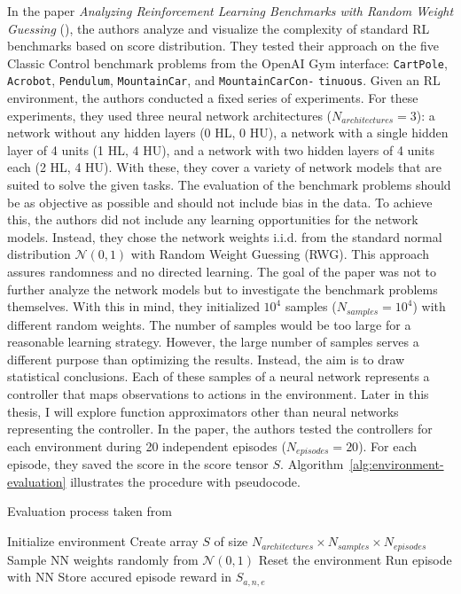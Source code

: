 In the paper \emph{Analyzing Reinforcement Learning Benchmarks with Random Weight Guessing} (\citet{oller_analyzing_2020}), the authors analyze and visualize the complexity of standard RL benchmarks based on score distribution. They tested their approach on the five Classic Control benchmark problems from the OpenAI Gym interface: \verb|CartPole|, \verb|Acrobot|, \verb|Pendulum|, \verb|MountainCar|, and \verb|MountainCarCon-| \verb|tinuous|. Given an RL environment, the authors conducted a fixed series of experiments. For these experiments, they used three neural network architectures ($N_{architectures}=3$): a network without any hidden layers (0 HL, 0 HU), a network with a single hidden layer of 4 units (1 HL, 4 HU), and a network with two hidden layers of 4 units each (2 HL, 4 HU). With these, they cover a variety of network models that are suited to solve the given tasks. The evaluation of the benchmark problems should be as objective as possible and should not include bias in the data. To achieve this, the authors did not include any learning opportunities for the network models. Instead, they chose the network weights i.i.d. from the standard normal distribution $\mathcal{N}(0,1)$ with Random Weight Guessing (RWG). This approach assures randomness and no directed learning. The goal of the paper was not to further analyze the network models but to investigate the benchmark problems themselves. With this in mind, they initialized $10^4$ samples ($N_{samples}=10^4$) with different random weights. The number of samples would be too large for a reasonable learning strategy. However, the large number of samples serves a different purpose than optimizing the results. Instead, the aim is to draw statistical conclusions. Each of these samples of a neural network represents a controller that maps observations to actions in the environment. Later in this thesis, I will explore function approximators other than neural networks representing the controller. In the paper, the authors tested the controllers for each environment during 20 independent episodes ($N_{episodes}=20$). For each episode, they saved the score in the score tensor $S$. Algorithm~\ref{alg:environment-evaluation} illustrates the procedure with pseudocode.

\begin{algorithm}
\caption{Evaluation process taken from \citet{oller_analyzing_2020}}
\begin{algorithmic}[1]
\State Initialize environment
\State Create array $S$ of size $N_{architectures} \times N_{samples} \times N_{episodes}$
    \State Sample NN weights randomly from $\mathcal{N}(0,1)$
      \State Reset the environment
      \State Run episode with NN
      \State Store accured episode reward in $S_{a,n,e}$
    \EndFor
\EndFor
\end{algorithmic}
\label{alg:environment-evaluation}
\end{algorithm}

